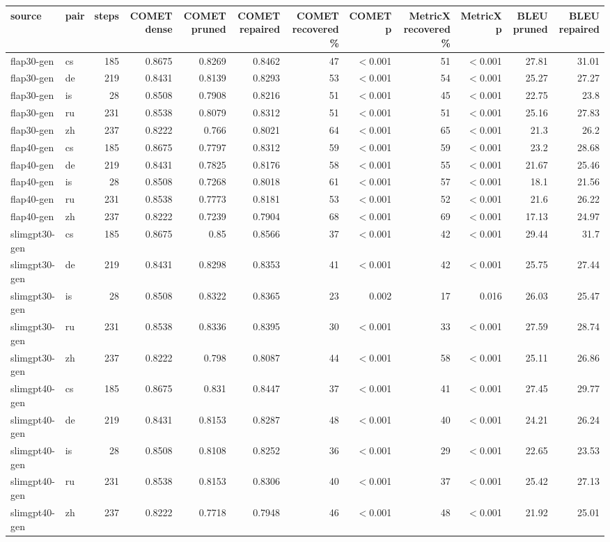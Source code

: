 \begin{tabular}{llrrrrrrrrrr}
\toprule
source & pair & steps & COMET dense & COMET pruned & COMET repaired & COMET recovered \% & COMET p & MetricX recovered \% & MetricX p & BLEU pruned & BLEU repaired \\
\midrule
flap30-gen & cs & 185 & 0.8675 & 0.8269 & 0.8462 & 47 & $<$0.001 & 51 & $<$0.001 & 27.81 & 31.01 \\
flap30-gen & de & 219 & 0.8431 & 0.8139 & 0.8293 & 53 & $<$0.001 & 54 & $<$0.001 & 25.27 & 27.27 \\
flap30-gen & is & 28 & 0.8508 & 0.7908 & 0.8216 & 51 & $<$0.001 & 45 & $<$0.001 & 22.75 & 23.8 \\
flap30-gen & ru & 231 & 0.8538 & 0.8079 & 0.8312 & 51 & $<$0.001 & 51 & $<$0.001 & 25.16 & 27.83 \\
flap30-gen & zh & 237 & 0.8222 & 0.766 & 0.8021 & 64 & $<$0.001 & 65 & $<$0.001 & 21.3 & 26.2 \\
flap40-gen & cs & 185 & 0.8675 & 0.7797 & 0.8312 & 59 & $<$0.001 & 59 & $<$0.001 & 23.2 & 28.68 \\
flap40-gen & de & 219 & 0.8431 & 0.7825 & 0.8176 & 58 & $<$0.001 & 55 & $<$0.001 & 21.67 & 25.46 \\
flap40-gen & is & 28 & 0.8508 & 0.7268 & 0.8018 & 61 & $<$0.001 & 57 & $<$0.001 & 18.1 & 21.56 \\
flap40-gen & ru & 231 & 0.8538 & 0.7773 & 0.8181 & 53 & $<$0.001 & 52 & $<$0.001 & 21.6 & 26.22 \\
flap40-gen & zh & 237 & 0.8222 & 0.7239 & 0.7904 & 68 & $<$0.001 & 69 & $<$0.001 & 17.13 & 24.97 \\
slimgpt30-gen & cs & 185 & 0.8675 & 0.85 & 0.8566 & 37 & $<$0.001 & 42 & $<$0.001 & 29.44 & 31.7 \\
slimgpt30-gen & de & 219 & 0.8431 & 0.8298 & 0.8353 & 41 & $<$0.001 & 42 & $<$0.001 & 25.75 & 27.44 \\
slimgpt30-gen & is & 28 & 0.8508 & 0.8322 & 0.8365 & 23 & 0.002 & 17 & 0.016 & 26.03 & 25.47 \\
slimgpt30-gen & ru & 231 & 0.8538 & 0.8336 & 0.8395 & 30 & $<$0.001 & 33 & $<$0.001 & 27.59 & 28.74 \\
slimgpt30-gen & zh & 237 & 0.8222 & 0.798 & 0.8087 & 44 & $<$0.001 & 58 & $<$0.001 & 25.11 & 26.86 \\
slimgpt40-gen & cs & 185 & 0.8675 & 0.831 & 0.8447 & 37 & $<$0.001 & 41 & $<$0.001 & 27.45 & 29.77 \\
slimgpt40-gen & de & 219 & 0.8431 & 0.8153 & 0.8287 & 48 & $<$0.001 & 40 & $<$0.001 & 24.21 & 26.24 \\
slimgpt40-gen & is & 28 & 0.8508 & 0.8108 & 0.8252 & 36 & $<$0.001 & 29 & $<$0.001 & 22.65 & 23.53 \\
slimgpt40-gen & ru & 231 & 0.8538 & 0.8153 & 0.8306 & 40 & $<$0.001 & 37 & $<$0.001 & 25.42 & 27.13 \\
slimgpt40-gen & zh & 237 & 0.8222 & 0.7718 & 0.7948 & 46 & $<$0.001 & 48 & $<$0.001 & 21.92 & 25.01 \\
\bottomrule
\end{tabular}
